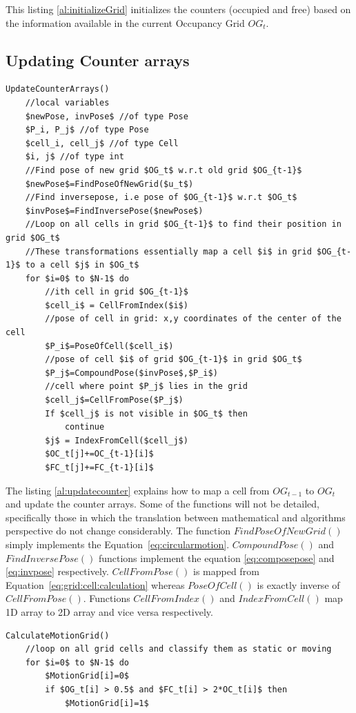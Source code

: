 This listing \ref{al:initializeGrid} initializes the counters (occupied and free) based on the information available in the current Occupancy Grid $OG_t$.

\subsection{Updating Counter arrays}

\begin{lstlisting}[label=al:updatecounter,mathescape=true,caption={Update counter arrays}]
UpdateCounterArrays()
	//local variables
	$newPose, invPose$ //of type Pose
	$P_i, P_j$ //of type Pose
	$cell_i, cell_j$ //of type Cell
	$i, j$ //of type int
	//Find pose of new grid $OG_t$ w.r.t old grid $OG_{t-1}$
	$newPose$=FindPoseOfNewGrid($u_t$)
	//Find inversepose, i.e pose of $OG_{t-1}$ w.r.t $OG_t$
	$invPose$=FindInversePose($newPose$)
	//Loop on all cells in grid $OG_{t-1}$ to find their position in grid $OG_t$
	//These transformations essentially map a cell $i$ in grid $OG_{t-1}$ to a cell $j$ in $OG_t$
	for $i=0$ to $N-1$ do
		//ith cell in grid $OG_{t-1}$
		$cell_i$ = CellFromIndex($i$)
		//pose of cell in grid: x,y coordinates of the center of the cell
		$P_i$=PoseOfCell($cell_i$)
		//pose of cell $i$ of grid $OG_{t-1}$ in grid $OG_t$
		$P_j$=CompoundPose($invPose$,$P_i$)
		//cell where point $P_j$ lies in the grid
		$cell_j$=CellFromPose($P_j$)
		If $cell_j$ is not visible in $OG_t$ then
			continue
		$j$ = IndexFromCell($cell_j$)
		$OC_t[j]+=OC_{t-1}[i]$
		$FC_t[j]+=FC_{t-1}[i]$
\end{lstlisting}
The listing \ref{al:updatecounter} explains how to map a cell from $OG_{t-1}$ to $OG_t$ and update the counter arrays. Some of the functions will not be detailed, specifically those in which the translation between mathematical and algorithms perspective do not change considerably.
The function $FindPoseOfNewGrid()$ simply implements the Equation~\ref{eq:circularmotion}. $CompoundPose()$ and \\$FindInversePose()$ functions implement the equation \ref{eq:composepose} and \ref{eq:invpose}  respectively. $CellFromPose()$ is mapped from Equation~\ref{eq:grid:cell:calculation} whereas $PoseOfCell()$ is exactly inverse of $CellFromPose()$. Functions $CellFromIndex()$ and $IndexFromCell()$ map 1D array to 2D array and vice versa respectively.

\begin{lstlisting}[label=al:motiongrid,mathescape=true,caption={Calculate motion grid}]
CalculateMotionGrid()
	//loop on all grid cells and classify them as static or moving
	for $i=0$ to $N-1$ do
		$MotionGrid[i]=0$
		if $OG_t[i] > 0.5$ and $FC_t[i] > 2*OC_t[i]$ then
			$MotionGrid[i]=1$
\end{lstlisting}

